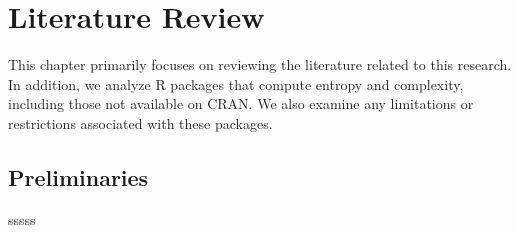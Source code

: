 \chapter{Literature Review}\label{C:lit}

This chapter primarily focuses on reviewing the literature related to this research. In addition, we analyze R packages that compute entropy and complexity, including those not available on CRAN. We also examine any limitations or restrictions associated with these packages.

\section{Preliminaries}
sssss

